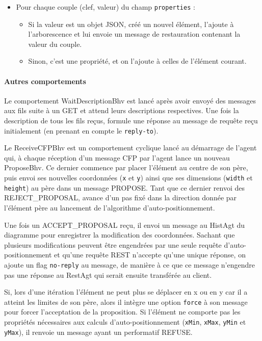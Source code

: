 \begin{itemize}
	\begin{itemize}
		\item Pour chaque couple (clef, valeur) du champ \lstinline$properties$ :
		\begin{itemize}
			\item Si la valeur est un objet JSON, créé un nouvel élément, l'ajoute à l'arborescence et lui envoie un message de restauration contenant la valeur du couple.
			\item Sinon, c'est une propriété, et on l'ajoute à celles de l'élément courant.
		\end{itemize}
	\end{itemize}
\end{itemize}

\newpage
\paragraph{Autres comportements}
Le comportement WaitDescriptionBhv est lancé après avoir envoyé des messages aux fils suite à un GET et attend leurs descriptions respectives.
Une fois la description de tous les fils reçus, formule une réponse au message de requête reçu initialement (en prenant en compte le \lstinline$reply-to$).

Le ReceiveCFPBhv est un comportement cyclique lancé au démarrage de l'agent qui, à chaque réception d'un message CFP par l'agent lance un nouveau ProposeBhv.
Ce dernier commence par placer l'élément au centre de son père, puis envoi ses nouvelles coordonnées (\lstinline$x$ et \lstinline$y$) ainsi que ses dimensions (\lstinline$width$ et \lstinline$height$) au père dans un message PROPOSE.
Tant que ce dernier renvoi des REJECT\_PROPOSAL, avance d'un pas fixé dans la direction donnée par l'élément père au lancement de l'algorithme d'auto-positionnement.

Une fois un ACCEPT\_PROPOSAL reçu, il envoi un message au HistAgt du diagramme pour enregistrer la modification des coordonnées.
Sachant que plusieurs modifications peuvent être engendrées par une seule requête d'auto-positionnement et qu'une requête REST n'accepte qu'une unique réponse, on ajoute un flag \lstinline$no-reply$ au message, de manière à ce que ce message n'engendre pas une réponse au RestAgt qui serait ensuite transférée au client.

Si, lors d'une itération l'élément ne peut plus se déplacer en x ou en y car il a atteint les limites de son père, alors il intègre une option \lstinline$force$ à son message pour forcer l'acceptation de la proposition.
Si l'élément ne comporte pas les propriétés nécessaires aux calculs d'auto-positionnement (\lstinline$xMin$, \lstinline$xMax$, \lstinline$yMin$ et \lstinline$yMax$), il renvoie un message ayant un performatif REFUSE.

